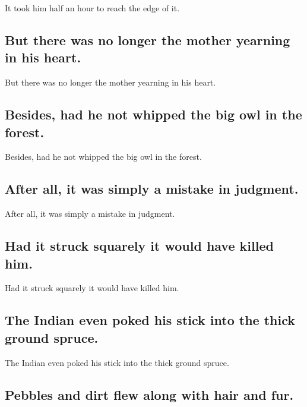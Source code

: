 \documentclass[]{article}
\begin{document}
It took him half an hour to reach the edge of it.

\hypertarget{but-there-was-no-longer-the-mother-yearning-in-his-heart.}{%
\subsection{But there was no longer the mother yearning in his
heart.}\label{but-there-was-no-longer-the-mother-yearning-in-his-heart.}}

But there was no longer the mother yearning in his heart.

\hypertarget{besides-had-he-not-whipped-the-big-owl-in-the-forest.}{%
\subsection{Besides, had he not whipped the big owl in the
forest.}\label{besides-had-he-not-whipped-the-big-owl-in-the-forest.}}

Besides, had he not whipped the big owl in the forest.

\hypertarget{after-all-it-was-simply-a-mistake-in-judgment.}{%
\subsection{After all, it was simply a mistake in
judgment.}\label{after-all-it-was-simply-a-mistake-in-judgment.}}

After all, it was simply a mistake in judgment.

\hypertarget{had-it-struck-squarely-it-would-have-killed-him.}{%
\subsection{Had it struck squarely it would have killed
him.}\label{had-it-struck-squarely-it-would-have-killed-him.}}

Had it struck squarely it would have killed him.

\hypertarget{the-indian-even-poked-his-stick-into-the-thick-ground-spruce.}{%
\subsection{The Indian even poked his stick into the thick ground
spruce.}\label{the-indian-even-poked-his-stick-into-the-thick-ground-spruce.}}

The Indian even poked his stick into the thick ground spruce.

\hypertarget{pebbles-and-dirt-flew-along-with-hair-and-fur.}{%
\subsection{Pebbles and dirt flew along with hair and
fur.}\label{pebbles-and-dirt-flew-along-with-hair-and-fur.}}
\end{document}
